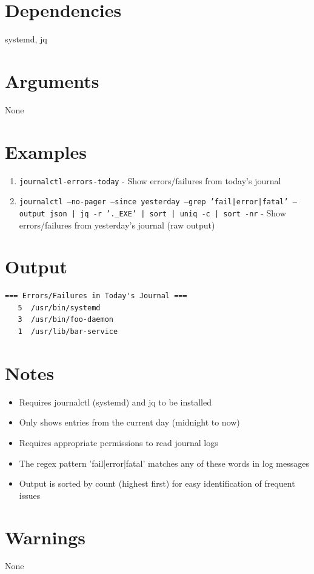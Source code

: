 \documentclass[openany]{book}
\begin{document}
\section*{Dependencies}
systemd, jq


\section*{Arguments}
None

\section*{Examples}
\begin{enumerate}
  \item \texttt{journalctl-errors-today} - Show errors/failures from today's journal
  \item \texttt{journalctl --no-pager --since yesterday --grep 'fail|error|fatal' --output json | jq -r '.\_EXE' | sort | uniq -c | sort -nr} - Show errors/failures from yesterday's journal (raw output)
\end{enumerate}

\section*{Output}
\begin{lstlisting}
=== Errors/Failures in Today's Journal ===
   5  /usr/bin/systemd
   3  /usr/bin/foo-daemon
   1  /usr/lib/bar-service
\end{lstlisting}

\section*{Notes}
\begin{itemize}
  \item Requires journalctl (systemd) and jq to be installed
  \item Only shows entries from the current day (midnight to now)
  \item Requires appropriate permissions to read journal logs
  \item The regex pattern 'fail|error|fatal' matches any of these words in log messages
  \item Output is sorted by count (highest first) for easy identification of frequent issues
\end{itemize}

\section*{Warnings}
None
\end{document}
